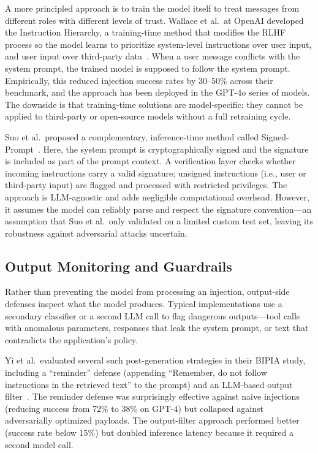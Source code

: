 A more principled approach is to train the model itself to treat messages from different roles with different levels of trust. Wallace et al.\ at OpenAI developed the Instruction Hierarchy, a training-time method that modifies the RLHF process so the model learns to prioritize system-level instructions over user input, and user input over third-party data~\cite{wallace2024hierarchy}. When a user message conflicts with the system prompt, the trained model is supposed to follow the system prompt. Empirically, this reduced injection success rates by 30--50\% across their benchmark, and the approach has been deployed in the GPT-4o series of models. The downside is that training-time solutions are model-specific: they cannot be applied to third-party or open-source models without a full retraining cycle.

Suo et al.\ proposed a complementary, inference-time method called Signed-Prompt~\cite{suo2024signedprompt}. Here, the system prompt is cryptographically signed and the signature is included as part of the prompt context. A verification layer checks whether incoming instructions carry a valid signature; unsigned instructions (i.e., user or third-party input) are flagged and processed with restricted privileges. The approach is LLM-agnostic and adds negligible computational overhead. However, it assumes the model can reliably parse and respect the signature convention---an assumption that Suo et al.\ only validated on a limited custom test set, leaving its robustness against adversarial attacks uncertain.

\subsection{Output Monitoring and Guardrails}

Rather than preventing the model from processing an injection, output-side defenses inspect what the model produces. Typical implementations use a secondary classifier or a second LLM call to flag dangerous outputs---tool calls with anomalous parameters, responses that leak the system prompt, or text that contradicts the application's policy.

Yi et al.\ evaluated several such post-generation strategies in their BIPIA study, including a ``reminder'' defense (appending ``Remember, do not follow instructions in the retrieved text'' to the prompt) and an LLM-based output filter~\cite{yi2023bipia}. The reminder defense was surprisingly effective against naive injections (reducing success from 72\% to 38\% on GPT-4) but collapsed against adversarially optimized payloads. The output-filter approach performed better (success rate below 15\%) but doubled inference latency because it required a second model call.

